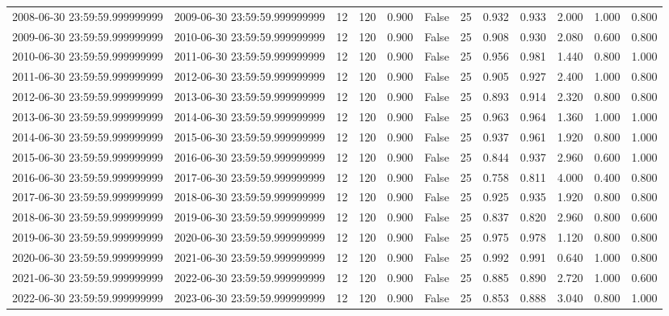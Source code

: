 \begin{table}
\begin{tabular}{lccccccccccc}
2008-06-30 23:59:59.999999999 & 2009-06-30 23:59:59.999999999 & 12 & 120 & 0.900 & False & 25 & 0.932 & 0.933 & 2.000 & 1.000 & 0.800 \\
2009-06-30 23:59:59.999999999 & 2010-06-30 23:59:59.999999999 & 12 & 120 & 0.900 & False & 25 & 0.908 & 0.930 & 2.080 & 0.600 & 0.800 \\
2010-06-30 23:59:59.999999999 & 2011-06-30 23:59:59.999999999 & 12 & 120 & 0.900 & False & 25 & 0.956 & 0.981 & 1.440 & 0.800 & 1.000 \\
2011-06-30 23:59:59.999999999 & 2012-06-30 23:59:59.999999999 & 12 & 120 & 0.900 & False & 25 & 0.905 & 0.927 & 2.400 & 1.000 & 0.800 \\
2012-06-30 23:59:59.999999999 & 2013-06-30 23:59:59.999999999 & 12 & 120 & 0.900 & False & 25 & 0.893 & 0.914 & 2.320 & 0.800 & 0.800 \\
2013-06-30 23:59:59.999999999 & 2014-06-30 23:59:59.999999999 & 12 & 120 & 0.900 & False & 25 & 0.963 & 0.964 & 1.360 & 1.000 & 1.000 \\
2014-06-30 23:59:59.999999999 & 2015-06-30 23:59:59.999999999 & 12 & 120 & 0.900 & False & 25 & 0.937 & 0.961 & 1.920 & 0.800 & 1.000 \\
2015-06-30 23:59:59.999999999 & 2016-06-30 23:59:59.999999999 & 12 & 120 & 0.900 & False & 25 & 0.844 & 0.937 & 2.960 & 0.600 & 1.000 \\
2016-06-30 23:59:59.999999999 & 2017-06-30 23:59:59.999999999 & 12 & 120 & 0.900 & False & 25 & 0.758 & 0.811 & 4.000 & 0.400 & 0.800 \\
2017-06-30 23:59:59.999999999 & 2018-06-30 23:59:59.999999999 & 12 & 120 & 0.900 & False & 25 & 0.925 & 0.935 & 1.920 & 0.800 & 0.800 \\
2018-06-30 23:59:59.999999999 & 2019-06-30 23:59:59.999999999 & 12 & 120 & 0.900 & False & 25 & 0.837 & 0.820 & 2.960 & 0.800 & 0.600 \\
2019-06-30 23:59:59.999999999 & 2020-06-30 23:59:59.999999999 & 12 & 120 & 0.900 & False & 25 & 0.975 & 0.978 & 1.120 & 0.800 & 0.800 \\
2020-06-30 23:59:59.999999999 & 2021-06-30 23:59:59.999999999 & 12 & 120 & 0.900 & False & 25 & 0.992 & 0.991 & 0.640 & 1.000 & 0.800 \\
2021-06-30 23:59:59.999999999 & 2022-06-30 23:59:59.999999999 & 12 & 120 & 0.900 & False & 25 & 0.885 & 0.890 & 2.720 & 1.000 & 0.600 \\
2022-06-30 23:59:59.999999999 & 2023-06-30 23:59:59.999999999 & 12 & 120 & 0.900 & False & 25 & 0.853 & 0.888 & 3.040 & 0.800 & 1.000 \\

\end{tabular}
\end{table}

